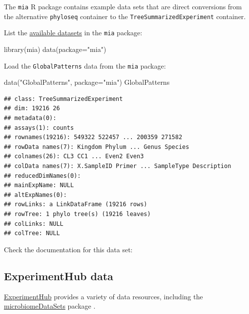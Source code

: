 \documentclass[
]{book}
\newenvironment{Shaded}{\begin{snugshade}}{\end{snugshade}}
\newcommand{\AttributeTok}[1]{\textcolor[rgb]{0.77,0.63,0.00}{#1}}
\newcommand{\FunctionTok}[1]{\textcolor[rgb]{0.00,0.00,0.00}{#1}}
\newcommand{\NormalTok}[1]{#1}
\newcommand{\StringTok}[1]{\textcolor[rgb]{0.31,0.60,0.02}{#1}}
\begin{document}
The \texttt{mia} R package contains example data sets that are direct
conversions from the alternative \texttt{phyloseq} container to the
\texttt{TreeSummarizedExperiment} container.

List the \href{https://microbiome.github.io/mia/reference/index.html}{available
datasets} in
the \texttt{mia} package:

\begin{Shaded}
\begin{Highlighting}[]
\FunctionTok{library}\NormalTok{(mia)}
\FunctionTok{data}\NormalTok{(}\AttributeTok{package=}\StringTok{"mia"}\NormalTok{)}
\end{Highlighting}
\end{Shaded}

Load the \texttt{GlobalPatterns} data from the \texttt{mia} package:

\begin{Shaded}
\begin{Highlighting}[]
\FunctionTok{data}\NormalTok{(}\StringTok{"GlobalPatterns"}\NormalTok{, }\AttributeTok{package=}\StringTok{"mia"}\NormalTok{)}
\NormalTok{GlobalPatterns}
\end{Highlighting}
\end{Shaded}

\begin{verbatim}
## class: TreeSummarizedExperiment 
## dim: 19216 26 
## metadata(0):
## assays(1): counts
## rownames(19216): 549322 522457 ... 200359 271582
## rowData names(7): Kingdom Phylum ... Genus Species
## colnames(26): CL3 CC1 ... Even2 Even3
## colData names(7): X.SampleID Primer ... SampleType Description
## reducedDimNames(0):
## mainExpName: NULL
## altExpNames(0):
## rowLinks: a LinkDataFrame (19216 rows)
## rowTree: 1 phylo tree(s) (19216 leaves)
## colLinks: NULL
## colTree: NULL
\end{verbatim}

Check the documentation for this data set:

\hypertarget{experimenthub-data}{%
\subsection{ExperimentHub data}\label{experimenthub-data}}

\href{https://bioconductor.org/packages/release/bioc/vignettes/ExperimentHub/inst/doc/ExperimentHub.html}{ExperimentHub}
provides a variety of data resources, including the
\href{https://bioconductor.org/packages/release/data/experiment/html/microbiomeDataSets.html}{microbiomeDataSets}
package \citep{Morgan2021, microlahti2021}.
\end{document}
